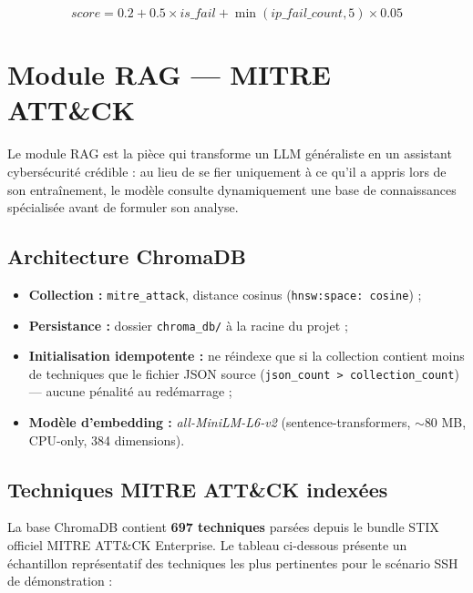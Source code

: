 \documentclass[12pt,a4paper]{report}
\begin{document}
\begin{tcolorbox}[colback=lightblue, colframe=darkblue, arc=5pt,
  title={\textbf{Formule de fallback heuristique}}]
\[
score = 0.2 + 0.5 \times is\_fail + \min(ip\_fail\_count, 5) \times 0.05
\]
\end{tcolorbox}

\section{Module RAG — MITRE ATT\&CK}
\begin{onehalfspace}
Le module RAG est la pièce qui transforme un LLM généraliste en un assistant
cybersécurité crédible : au lieu de se fier uniquement à ce qu'il a appris
lors de son entraînement, le modèle consulte dynamiquement une base de
connaissances spécialisée avant de formuler son analyse.

\subsection*{Architecture ChromaDB}
\begin{itemize}
  \item[\ding{43}] \textbf{Collection :} \texttt{mitre\_attack}, distance cosinus
  (\texttt{hnsw:space: cosine}) ;
  \item[\ding{43}] \textbf{Persistance :} dossier \texttt{chroma\_db/} à la
  racine du projet ;
  \item[\ding{43}] \textbf{Initialisation idempotente :} ne réindexe que si
  la collection contient moins de techniques que le fichier JSON source
  (\texttt{json\_count > collection\_count}) — aucune pénalité au redémarrage ;
  \item[\ding{43}] \textbf{Modèle d'embedding :} \textit{all-MiniLM-L6-v2}
  (sentence-transformers, $\sim$80 MB, CPU-only, 384 dimensions).
\end{itemize}

\subsection*{Techniques MITRE ATT\&CK indexées}
\end{onehalfspace}

La base ChromaDB contient \textbf{697 techniques} parsées depuis le bundle
STIX officiel MITRE ATT\&CK Enterprise. Le tableau ci-dessous présente un
échantillon représentatif des techniques les plus pertinentes pour
le scénario SSH de démonstration :
\end{document}
